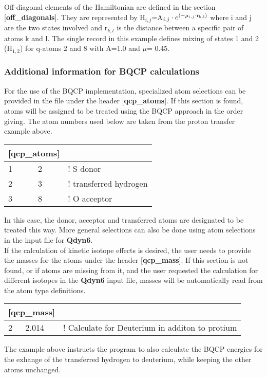 \documentclass[a4paper,11pt]{article}
\begin{document}
Off-diagonal elements of the Hamiltonian are defined in the
section [\textbf{off{\_}diagonals}]. They are represented by
H$_{i,j}$=A$_{i,j}\cdot e^{\left(-\mu _{i,j}\cdot \rm{r}_{k,l}\right)}$ where
i and j are the two states involved and r$_{k,l}$ is the distance
between a specific pair of atoms k and l. The single record in
this example defines mixing of states 1 and 2 (H$_{1,2}$) for
q-atoms 2 and 8 with A=1.0 and $\mu $= 0.45.

\subsubsection{Additional information for BQCP calculations}
For the use of the BQCP implementation, specialized atom selections can be provided
in the file under the header [\textbf{qcp{\_}atoms}]. If this section is found, atoms
will be assigned to be treated using the BQCP approach in the order giving. 
The atom numbers used below are taken from the proton transfer example above.
\begin{center}
\begin{tabularx}{\textwidth}{| l l |X|}
  \hline \multicolumn{2}{|l|}{[qcp{\_}atoms]} & \\
  \hline 1 & 2 & ! S donor\\
  \hline 2 & 3 & ! transferred hydrogen\\
  \hline 3 & 8 & ! O acceptor\\
  \hline
\end{tabularx}
\end{center}
In this case, the donor, acceptor and transferred atoms are designated to be treated
this way. More general selections can also be done using atom selections
in the input file for \textbf{Qdyn6}.\\
If the calculation of kinetic isotope effects is desired, the user needs to provide
the masses for the atoms under the header [\textbf{qcp{\_}mass}]. If this section is
not found, or if atoms are missing from it, and the user requested the calculation 
for different isotopes in the \textbf{Qdyn6} input file, masses will be automatically 
read from the atom type definitions.
\begin{center}
\begin{tabularx}{\textwidth}{|l l |X|}
	\hline \multicolumn{2}{|l|}{[qcp{\_}mass]} & \\
	\hline 2 & 2.014 & ! Calculate for Deuterium in additon to protium\\
	\hline
\end{tabularx}
\end{center}
The example above instructs the program to also calculate the BQCP energies for
the exhange of the transferred hydrogen to deuterium, while keeping the other atoms unchanged.
\end{document}
